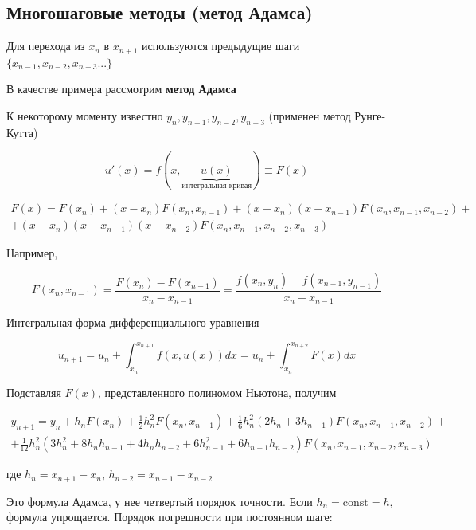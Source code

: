 \subsection{Многошаговые методы (метод Адамса)}

Для перехода из $x_n$ в $x_{n+1}$ используются предыдущие
шаги $\{x_{n-1}, x_{n-2}, x_{n-3} ...\}$

В качестве примера рассмотрим \textbf{метод Адамса}

К некоторому моменту известно $y_n, y_{n-1}, y_{n-2}, y_{n-3}$
(применен метод Рунге-Кутта)

\begin{equation*}
    u'(x) = f(x, \underbrace{u(x)}_\text{интегральная кривая})
    \equiv F(x)
\end{equation*}

\begin{multline*}
    F(x) = F(x_n) + (x - x_n) F(x_n, x_{n-1}) +
    (x-x_n)(x - x_{n-1}) F(x_n, x_{n-1}, x_{n-2}) + \\
    + (x - x_n) (x - x_{n-1}) (x - x_{n-2}) F(x_n, x_{n-1}, x_{n-2},
    x_{n-3})
\end{multline*}

Например,

\begin{equation*}
    F(x_n, x_{n-1}) = \frac{F(x_n) - F(x_{n-1})}{x_n - x_{n-1}} =
    \frac{f(x_n, y_n) - f(x_{n-1}, y_{n-1})}{x_n - x_{n-1}}
\end{equation*}

Интегральная форма дифференциального уравнения

\begin{equation*}
    u_{n+1} = u_n + \int_{x_n}^{x_{n+1}} f(x, u(x)) dx =
    u_n + \int_{x_n}^{x_{n+2}} F(x) dx
\end{equation*}

Подставляя $F(x)$, представленного полиномом Ньютона, получим

\begin{multline*}
    y_{n+1} = y_n + h_n F(x_n) +
    \frac{1}{2} h_n^2 F(x_n, x_{n+1}) +
    \frac{1}{6} h_n^2 (2h_n + 3 h_{n-1})
    F(x_n, x_{n-1}, x_{n-2}) + \\
    + \frac{1}{12} h_n^2 (3h_n^2 + 8h_nh_{n-1} + 4h_nh_{n-2} +
    6h_{n-1}^2 + 6 h_{n-1}h_{n-2}) F(x_n, x_{n-1}, x_{n-2}, x_{n-3})
\end{multline*}

где $h_n = x_{n+1} - x_n$, $h_{n-2} = x_{n-1}-x_{n-2}$

Это формула Адамса, у нее четвертый порядок точности.
Если $h_n = \text{const} = h$, формула упрощается.
Порядок погрешности при постоянном шаге:

